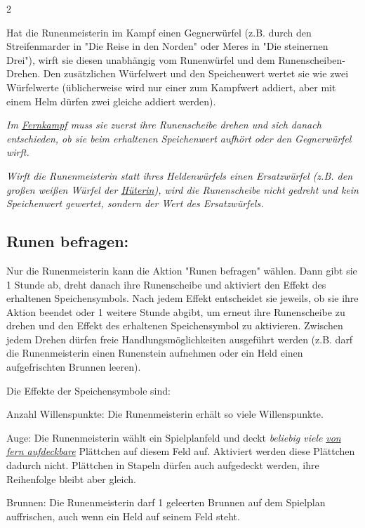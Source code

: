 \documentclass[10pt, a4paper, oneside]{book}
\newcommand{\fan}[1]{\textit{#1}}
\begin{document}
\begin{multicols*}{2}
\begin{nobgcolor}
Hat die Runenmeisterin im Kampf einen Gegnerwürfel (z.B. durch den Streifenmarder in "Die Reise in den Norden" oder Meres in "Die steinernen Drei"), wirft sie diesen unabhängig vom Runenwürfel und dem Runenscheiben-Drehen. Den zusätzlichen Würfelwert und den Speichenwert wertet sie wie zwei Würfelwerte (üblicherweise wird nur einer zum Kampfwert addiert, aber mit einem Helm dürfen zwei gleiche addiert werden).
\supercite{89633}

\fan{Im \hyperref[fernkaempfer]{Fernkampf} muss sie zuerst ihre Runenscheibe drehen und sich danach entschieden, ob sie beim erhaltenen Speichenwert aufhört oder den Gegnerwürfel wirft.}


\fan{Wirft die Runenmeisterin statt ihres Heldenwürfels einen Ersatzwürfel (z.B. den großen weißen Würfel der \hyperref[hueterin]{Hüterin}), wird die Runenscheibe nicht gedreht und kein Speichenwert gewertet, sondern der Wert des Ersatzwürfels.} 






\subsection{Runen befragen:}

Nur die Runenmeisterin kann die Aktion "Runen befragen" wählen. Dann gibt sie 1 Stunde ab, dreht danach ihre Runenscheibe und aktiviert den Effekt des erhaltenen Speichensymbols.\supercite{mh-runen,89746} Nach jedem Effekt entscheidet sie jeweils, ob sie ihre Aktion beendet oder 1 weitere Stunde abgibt, um erneut ihre Runenscheibe zu drehen und den Effekt des erhaltenen Speichensymbol zu aktivieren. Zwischen jedem Drehen dürfen freie Handlungsmöglichkeiten ausgeführt werden (z.B. darf die Runenmeisterin einen Runenstein aufnehmen oder ein Held einen aufgefrischten Brunnen leeren).
\supercite{88563}


Die Effekte der Speichensymbole sind:\supercite{mh-runen,mh-begleitheft}

\bullet{} Anzahl Willenspunkte: Die Runenmeisterin erhält so viele Willenspunkte.

\bullet{} Auge: Die Runenmeisterin wählt ein Spielplanfeld und deckt \fan{beliebig viele} \hyperref[aufdecken]{\fan{von fern aufdeckbare}}\supercite{88631} Plättchen auf diesem Feld auf. Aktiviert werden diese Plättchen dadurch nicht. Plättchen in Stapeln dürfen auch aufgedeckt werden, ihre Reihenfolge bleibt aber gleich.

\bullet{} Brunnen: Die Runenmeisterin darf 1 geleerten Brunnen auf dem Spielplan auffrischen, auch wenn ein Held auf seinem Feld steht.
\supercite{94130}


\end{nobgcolor}
\end{multicols*}
\end{document}
